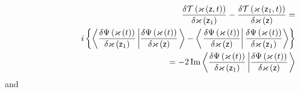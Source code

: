 \begin{eqnarray}
&&\frac{\delta {\cal T}\left( \varkappa \left( {\sf z},t\right) \right) }{%
\delta \varkappa \left( {\sf z}_{1}\right) }-\frac{\delta {\cal T}\left(
\varkappa \left( {\sf z}_{1},t\right) \right) }{\delta \varkappa \left( {\sf %
z}\right) }=  \nonumber \\
&&\left. {}\right. \qquad \qquad \qquad i\left\{ \left\langle \frac{\delta
\Psi \left( {\cal \varkappa }\left( t\right) \right) }{\delta {\cal %
\varkappa }\left( {\sf z}_{1}\right) }\left| \frac{\delta \Psi \left( {\cal %
\varkappa }\left( t\right) \right) }{\delta {\cal \varkappa }\left( {\sf z}%
\right) }\right. \right\rangle -\left\langle \left. \frac{\delta \Psi \left( 
{\cal \varkappa }\left( t\right) \right) }{\delta {\cal \varkappa }\left( 
{\sf z}\right) }\right| \frac{\delta \Psi \left( {\cal \varkappa }\left(
t\right) \right) }{\delta {\cal \varkappa }\left( {\sf z}_{1}\right) }%
\right\rangle \right\}   \nonumber \\
&&\left. {}\right. \qquad \qquad \qquad =-2%
\mathop{\rm Im}%
\left\langle \frac{\delta \Psi \left( {\cal \varkappa }\left( t\right)
\right) }{\delta {\cal \varkappa }\left( {\sf z}_{1}\right) }\left| \frac{%
\delta \Psi \left( {\cal \varkappa }\left( t\right) \right) }{\delta {\cal %
\varkappa }\left( {\sf z}\right) }\right. \right\rangle 
\end{eqnarray}%
and 
